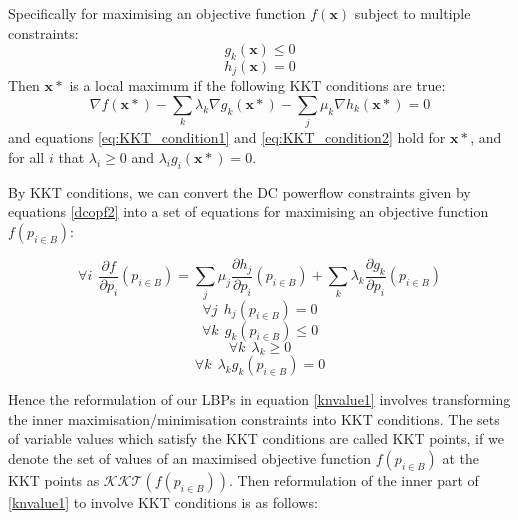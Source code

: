 Specifically for maximising an objective function $f(\mathbf{x})$ subject to multiple constraints:
\begin{equation}\label{eq:KKT_condition1} g_k(\mathbf{x})\le 0 \end{equation}
\begin{equation}\label{eq:KKT_condition2} h_j(\mathbf{x})=0 \end{equation}
Then $\mathbf{x}*$ is a local maximum if the following KKT conditions are true:
\begin{equation}\label{eq:KKT_conditions3} \nabla f(\mathbf{x}*) - \sum_k\lambda_k\nabla g_k(\mathbf{x}*) - \sum_j\mu_k\nabla h_k(\mathbf{x}*) =0\end{equation}
and equations \ref{eq:KKT_condition1} and \ref{eq:KKT_condition2} hold for $\mathbf{x}*$, and for all $i$ that $\lambda_i\ge 0$ and $\lambda_ig_i(\mathbf{x}*)=0$.

By KKT conditions, we can convert the DC powerflow constraints given by equations \ref{dcopf2} into a set of equations for maximising an objective function $f(p_{i\in B})$:

\begin{equation}\forall i~~\frac{\partial f}{\partial p_i}(p_{i\in B})=\sum_j\mu_j\frac{\partial h_j}{\partial p_i}(p_{i\in B}) + \sum_k\lambda_k\frac{\partial g_k}{\partial p_i}(p_{i\in B})\end{equation}
\begin{equation}\forall j~~ h_j(p_{i\in B})=0\end{equation}
\begin{equation}\forall k~~ g_k(p_{i\in B})\le 0\end{equation}
\begin{equation}\forall k~~ \lambda_k \ge 0\end{equation}
\begin{equation}\label{eq:complementarity_constraint_KKT}\forall k~~ \lambda_kg_k(p_{i\in B}) = 0\end{equation}

Hence the reformulation of our LBPs in equation \ref{knvalue1} involves transforming the inner maximisation/minimisation constraints into KKT conditions.
The sets of variable values which satisfy the KKT conditions are called KKT points, if we denote the set of values of an maximised objective function $f(p_{i\in B})$ at the KKT points as $\mathcal{KKT}(f(p_{i\in B}))$.
Then reformulation of the inner part of \eqref{knvalue1} to involve KKT conditions is as follows:

